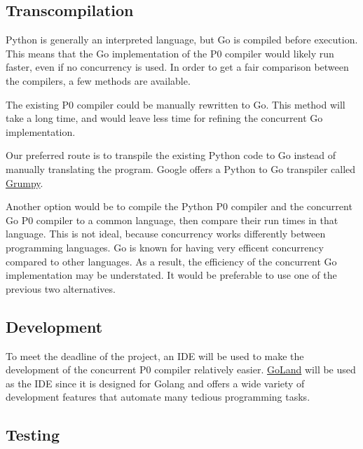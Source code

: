 \documentclass{article}
\begin{document}
\subsection{Transcompilation} %

Python is generally an interpreted language, but Go is compiled before execution.
This means that the Go implementation of the P0 compiler would likely run
faster, even if no concurrency is used.
In order to get a fair comparison between the compilers, a few methods are
available.

The existing P0 compiler could be manually rewritten to Go.
This method will take a long time, and would leave less time for refining the
concurrent Go implementation.

Our preferred route is to transpile the existing Python code to Go instead of
manually translating the program.
Google offers a Python to Go transpiler called
\href{https://github.com/google/grumpy}{Grumpy}.

Another option would be to compile the Python P0 compiler and the concurrent Go
P0 compiler to a common language, then compare their run times in that 
language.
This is not ideal, because concurrency works differently between programming
languages.
Go is known for having very efficent concurrency compared to other languages.
As a result, the efficiency of the concurrent Go implementation may be
understated.
It would be preferable to use one of the previous two alternatives.

\subsection{Development} %
To meet the deadline of the project, an IDE will be used to make the development of the concurrent
P0 compiler relatively easier. \href{https://www.jetbrains.com/go/}{GoLand} will be used as the IDE
since it is designed for Golang and offers a wide variety of development features that automate
many tedious programming tasks.



\subsection{Testing} %
\end{document}
